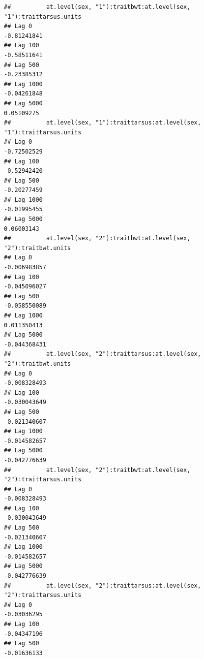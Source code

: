 \documentclass[
  12pt,
]{book}
\begin{document}
\begin{verbatim}
##          at.level(sex, "1"):traitbwt:at.level(sex, "1"):traittarsus.units
## Lag 0                                                         -0.81241841
## Lag 100                                                       -0.58511641
## Lag 500                                                       -0.23385312
## Lag 1000                                                      -0.04261848
## Lag 5000                                                       0.05109275
##          at.level(sex, "1"):traittarsus:at.level(sex, "1"):traittarsus.units
## Lag 0                                                            -0.72502529
## Lag 100                                                          -0.52942420
## Lag 500                                                          -0.20277459
## Lag 1000                                                         -0.01995455
## Lag 5000                                                          0.06003143
##          at.level(sex, "2"):traitbwt:at.level(sex, "2"):traitbwt.units
## Lag 0                                                     -0.006983857
## Lag 100                                                   -0.045096027
## Lag 500                                                   -0.058550089
## Lag 1000                                                   0.011350413
## Lag 5000                                                  -0.044368431
##          at.level(sex, "2"):traittarsus:at.level(sex, "2"):traitbwt.units
## Lag 0                                                        -0.008328493
## Lag 100                                                      -0.030043649
## Lag 500                                                      -0.021340607
## Lag 1000                                                     -0.014582657
## Lag 5000                                                     -0.042776639
##          at.level(sex, "2"):traitbwt:at.level(sex, "2"):traittarsus.units
## Lag 0                                                        -0.008328493
## Lag 100                                                      -0.030043649
## Lag 500                                                      -0.021340607
## Lag 1000                                                     -0.014582657
## Lag 5000                                                     -0.042776639
##          at.level(sex, "2"):traittarsus:at.level(sex, "2"):traittarsus.units
## Lag 0                                                            -0.03036295
## Lag 100                                                          -0.04347196
## Lag 500                                                          -0.01636133

\end{verbatim}
\end{document}
